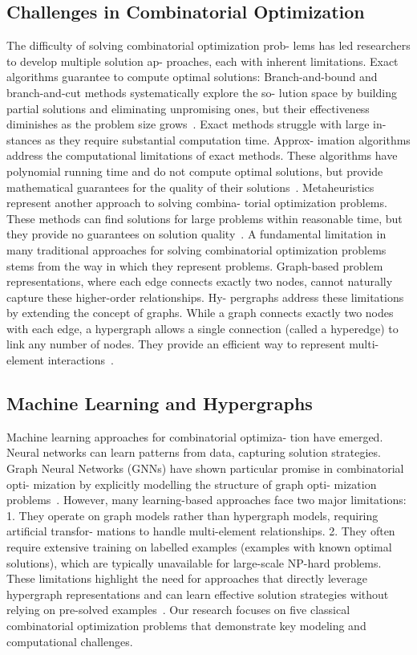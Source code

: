 \documentclass[conference]{IEEEtran}
\begin{document}
\subsection{Challenges in Combinatorial Optimization}
The difficulty of solving combinatorial optimization prob-
lems has led researchers to develop multiple solution ap-
proaches, each with inherent limitations. Exact algorithms
guarantee to compute optimal solutions: Branch-and-bound
and branch-and-cut methods systematically explore the so-
lution space by building partial solutions and eliminating
unpromising ones, but their effectiveness diminishes as the
problem size grows~\cite{LandDoig1960,PadbergRinaldi1991}. Exact methods struggle with large in-
stances as they require substantial computation time. Approx-
imation algorithms address the computational limitations of
exact methods. These algorithms have polynomial running
time and do not compute optimal solutions, but provide
mathematical guarantees for the quality of their solutions~\cite{Vazirani2001}.
Metaheuristics represent another approach to solving combina-
torial optimization problems. These methods can find solutions
for large problems within reasonable time, but they provide no
guarantees on solution quality~\cite{Kirkpatrick1983,Holland1975,Glover1989}.
A fundamental limitation in many traditional approaches for
solving combinatorial optimization problems stems from the
way in which they represent problems. Graph-based problem
representations, where each edge connects exactly two nodes,
cannot naturally capture these higher-order relationships. Hy-
pergraphs address these limitations by extending the concept
of graphs. While a graph connects exactly two nodes with
each edge, a hypergraph allows a single connection (called
a hyperedge) to link any number of nodes. They provide an
efficient way to represent multi-element interactions~\cite{Berge1973}.

\subsection{Machine Learning and Hypergraphs}
Machine learning approaches for combinatorial optimiza-
tion have emerged. Neural networks can learn patterns from
data, capturing solution strategies. Graph Neural Networks
(GNNs) have shown particular promise in combinatorial opti-
mization by explicitly modelling the structure of graph opti-
mization problems~\cite{Scarselli2009,KipfWelling2017}. However, many learning-based approaches
face two major limitations: 1. They operate on graph models
rather than hypergraph models, requiring artificial transfor-
mations to handle multi-element relationships. 2. They often
require extensive training on labelled examples (examples
with known optimal solutions), which are typically unavailable
for large-scale NP-hard problems. These limitations highlight
the need for approaches that directly leverage hypergraph
representations and can learn effective solution strategies
without relying on pre-solved examples~\cite{Feng2019}. Our research focuses
on five classical combinatorial optimization problems that
demonstrate key modeling and computational challenges.
\end{document}
